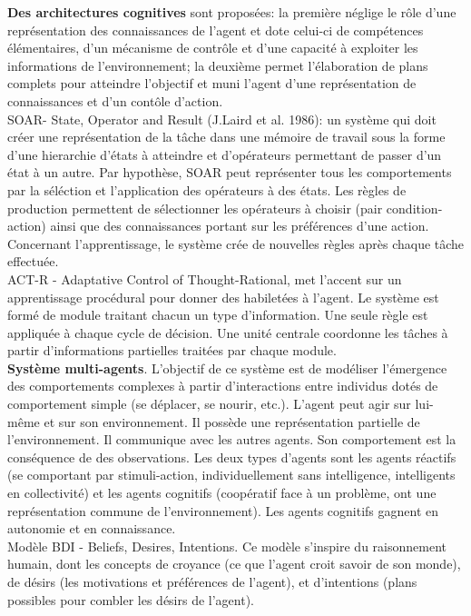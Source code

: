 \documentclass[11pt]{article}
\begin{document}
\textbf{Des architectures cognitives} sont proposées: la première néglige le rôle d'une représentation des connaissances de l'agent et dote celui-ci de compétences élémentaires, d'un mécanisme de contrôle et d'une capacité à exploiter les informations de l'environnement; la deuxième permet l'élaboration de plans complets pour atteindre l'objectif et muni l'agent d'une représentation de connaissances et d'un contôle d'action.\\
SOAR- State, Operator and Result (J.Laird et al. 1986): un système qui doit créer une représentation de la tâche dans une mémoire de travail sous la forme d'une hierarchie d'états à atteindre et d'opérateurs permettant de passer d'un état à un autre. Par hypothèse, SOAR peut représenter tous les comportements par la séléction et l'application des opérateurs à des états. Les règles de production permettent de sélectionner les opérateurs à choisir (pair condition-action) ainsi que des connaissances portant sur les préférences d'une action. Concernant l'apprentissage, le système crée de nouvelles règles après chaque tâche effectuée. \\
ACT-R - Adaptative Control of Thought-Rational, met l'accent sur un apprentissage procédural pour donner des habiletées à l'agent. Le système est formé de module traitant chacun un type d'information. Une seule règle est appliquée à chaque cycle de décision. Une unité centrale coordonne les tâches à partir d'informations partielles traitées par chaque module.\\

\textbf{Système multi-agents}. L'objectif de ce système est de modéliser l'émergence des comportements complexes à partir d'interactions entre individus dotés de comportement simple (se déplacer, se nourir, etc.). L'agent peut agir sur lui-même et sur son environnement. Il possède une représentation partielle de l'environnement. Il communique avec les autres agents. Son comportement est la conséquence de des observations. Les deux types d'agents sont les agents réactifs (se comportant par stimuli-action, individuellement sans intelligence, intelligents en collectivité) et les agents cognitifs (coopératif face à un problème, ont une représentation commune de l'environnement). Les agents cognitifs gagnent en autonomie et en connaissance.\\
Modèle BDI - Beliefs, Desires, Intentions. Ce modèle s'inspire du raisonnement humain, dont les concepts de croyance (ce que l'agent croit savoir de son monde), de désirs (les motivations et préférences de l'agent), et d'intentions (plans possibles pour  combler les désirs de l'agent).
\end{document}
